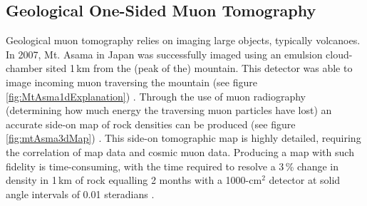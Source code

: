 

\subsection{Geological One-Sided Muon Tomography}  \label{sec:geologicalTomography} %
Geological muon tomography relies on imaging large objects, typically volcanoes. In 2007, Mt. Asama in Japan was successfully imaged using an emulsion cloud-chamber sited 1\,km from the (peak of the) mountain. This detector was able to image incoming muon traversing the mountain (see figure \ref{fig:MtAsma1dExplanation}) \cite{Tanaka_mtAsama_2007}. Through the use of muon radiography (determining how much energy the traversing muon particles have lost) an accurate side-on map of rock densities can be produced (see figure \ref{fig:mtAsma3dMap}) \cite{Tanaka_mtAsama_2007}. This side-on tomographic map is highly detailed, requiring the correlation of map data and cosmic muon data. Producing a map with such fidelity is time-consuming, with the time required to resolve a 3\,\% change in density in 1\,km of rock equalling 2 months with a 1000-cm$^2$ detector at solid angle intervals of 0.01 steradians \cite{Tanaka_mtAsama_2007}.

